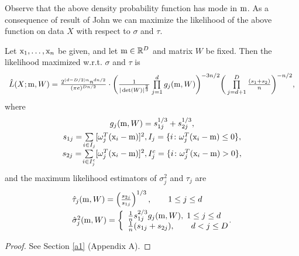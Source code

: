 Observe that the above density probability function has mode in $\mathrm{m}$.
As a consequence of result of John \cite{john1982three} we can maximize the likelihood of the above function on data $X$ with respect to $\sigma$ and $\tau$.

\begin{theorem}\label{the:min}
Let $\mathrm{x}_1,\ldots,\mathrm{x}_n$ be given, and let $\mathrm{m} \in \mathbb{R}^D$ and matrix $W$
be fixed.  
Then the likelihood maximized w.r.t. $\sigma$ and $\tau$ is
\begin{equation}\label{eq:1}
\begin{array}{l}
 \hat{L}(X;\m,W) =   \frac{ 2^{(d-D/2)n} n^{dn/2} }{(\pi e)^{Dn/2}} %
 \cdot \bigg( \frac{1}{|\det(W)|^{\frac{2}{3}}} \prod\limits_{j=1}^{d} g_{j}(\m,W) \bigg)^{-3n/2} 
\bigg( \prod\limits_{j=d+1}^{D} \frac{(s_1+s_2)}{n} \bigg)^{-n/2},
\end{array}
\end{equation}
where
$$
\begin{array}{c}
{g}_{j}(\mathrm{m},W) = {s}_{1j}^{1/3} + {s}_{2j}^{1/3},
\\[1ex]
{s}_{1j}= \! \sum\limits_{i \in I_j}[ \omega_{j}^T (\mathrm{x}_i-\mathrm{m})]^2,  {I}_j=\{ i  \colon \omega_{j}^T (\mathrm{x}_i-\mathrm{m}) \leq 0 \},
\\[1ex]
{s}_{2j}= \! \sum\limits_{i \in I_j^c}[ \omega_{j}^T (\mathrm{x}_i-\mathrm{m})]^2, {I}_j^c=\{ i \colon  \omega_{j}^T (\mathrm{x}_i-\mathrm{m}) > 0 \},
\end{array}
$$
and the maximum likelihood estimators of $\sigma_{j}^2$ and $\tau_{j}$ are
\begin{equation}\label{eq:est}
\begin{array}{l}
\hat \tau_{j}(\mathrm{m},W)=\left(\frac{s_{2j}}{s_{1j}}\right)^{1/3}, \qquad 1 \leq j \leq d\\[6px]
\hat \sigma_j^2(\mathrm{m},W) = \left\{ \begin{array}{l}
\tfrac{1}{n} s_{1j}^{2/3} g_{j}(\mathrm{m},W), \; 1 \leq j \leq d\\
\tfrac{1}{n} (s_{1j}+s_{2j}), \qquad d < j \leq D\\
\end{array} \right. \!\!\!\!.
\end{array}
\end{equation}
\end{theorem}

\begin{proof}
See Section \ref{a1} (Appendix A).
\end{proof}

